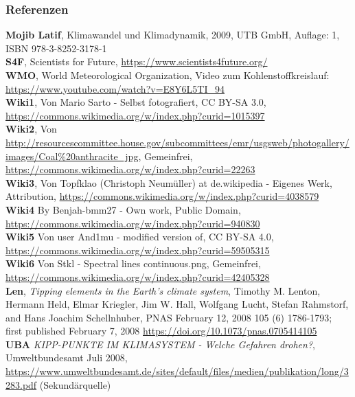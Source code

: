 \begin{frame}
	\frametitle{Referenzen}
	\small{
	\textbf{Mojib Latif}, Klimawandel und Klimadynamik, 2009, UTB GmbH, Auflage: 1, ISBN 978-3-8252-3178-1\\
	\textbf{S4F}, Scientists for Future, \url{https://www.scientists4future.org/}\\
	\textbf{WMO}, World Meteorological Organization, Video zum Kohlenstoffkreislauf: \url{https://www.youtube.com/watch?v=E8Y6L5TI\_94}\\
	\textbf{Wiki1}, Von Mario Sarto - Selbst fotografiert, CC BY-SA 3.0, \url{https://commons.wikimedia.org/w/index.php?curid=1015397}\\
	\textbf{Wiki2}, Von \url{http://resourcescommittee.house.gov/subcommittees/emr/usgsweb/photogallery/images/Coal\%20anthracite\_jpg}, Gemeinfrei, \url{https://commons.wikimedia.org/w/index.php?curid=22263}\\
	\textbf{Wiki3}, Von Topfklao (Christoph Neumüller) at de.wikipedia - Eigenes Werk, Attribution, \url{https://commons.wikimedia.org/w/index.php?curid=4038579}\\
	\textbf{Wiki4} By Benjah-bmm27 - Own work, Public Domain, \url{https://commons.wikimedia.org/w/index.php?curid=940830}\\
	\textbf{Wiki5} Von user And1mu - modified version of, CC BY-SA 4.0, \url{https://commons.wikimedia.org/w/index.php?curid=59505315}\\
	\textbf{Wiki6} Von Stkl - Spectral lines continuous.png, Gemeinfrei, \url{https://commons.wikimedia.org/w/index.php?curid=42405328}\\
	\textbf{Len}, \textit{Tipping elements in the Earth's climate system},
	Timothy M. Lenton, Hermann Held, Elmar Kriegler, Jim W. Hall, Wolfgang Lucht, Stefan Rahmstorf, and Hans Joachim Schellnhuber,
	PNAS February 12, 2008 105 (6) 1786-1793; first published February 7, 2008 \url{https://doi.org/10.1073/pnas.0705414105} \\
	\textbf{UBA} \textit{KIPP-PUNKTE IM KLIMASYSTEM - Welche Gefahren drohen?}, Umweltbundesamt Juli 2008, \url{https://www.umweltbundesamt.de/sites/default/files/medien/publikation/long/3283.pdf} (Sekundärquelle)
	}
\end{frame}

